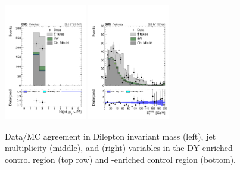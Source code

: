 \begin{figure}[htb]
        \includegraphics[width=0.32\textwidth]{ch9_figs/chargeFlip_closureTt/nJet25.pdf}
        \includegraphics[width=0.32\textwidth]{ch9_figs/chargeFlip_closureTt/met.pdf}
        \caption[Data/MC agreement in charge flip control regions]{Data/MC agreement in Dilepton invariant mass (left), jet multiplicity (middle), and \met (right) variables
        in the DY enriched control region (top row) and \ttbar-enriched control region (bottom).}
        \label{fig:chargeFlip_cr}
\end{figure}
